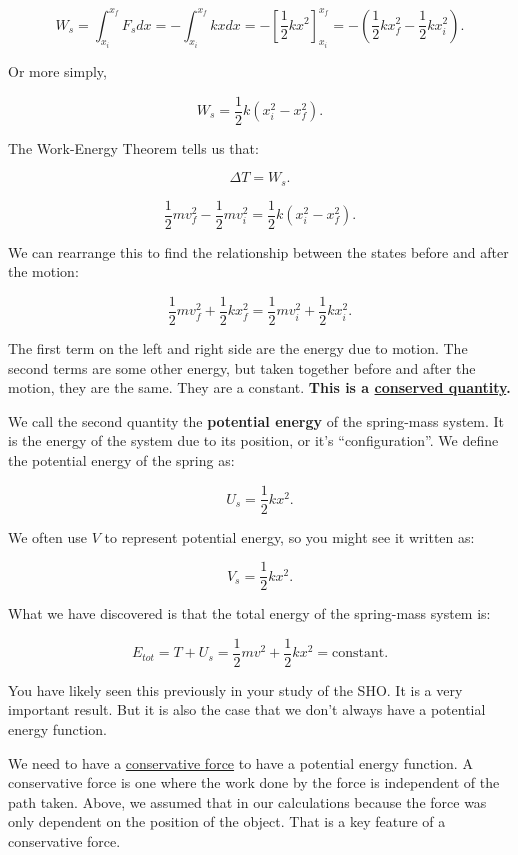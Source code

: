 \documentclass[11pt]{article}
\begin{document}
\[W_s = \int_{x_i}^{x_f} F_s dx = -\int_{x_i}^{x_f} kx dx = -\left[\dfrac{1}{2}kx^2\right]_{x_i}^{x_f} = -\left(\dfrac{1}{2}kx_f^2 - \dfrac{1}{2}kx_i^2\right).\]

Or more simply,

\[W_s = \dfrac{1}{2}k(x_i^2 - x_f^2).\]

The Work-Energy Theorem tells us that:

\[\Delta T = W_s.\]

\[\dfrac{1}{2}mv_f^2 - \dfrac{1}{2}mv_i^2 = \dfrac{1}{2}k(x_i^2 - x_f^2).\]

We can rearrange this to find the relationship between the states before
and after the motion:

\[\dfrac{1}{2}mv_f^2 + \dfrac{1}{2}k x_f^2 = \dfrac{1}{2}mv_i^2 + \dfrac{1}{2}k x_i^2.\]

The first term on the left and right side are the energy due to motion.
The second terms are some other energy, but taken together before and
after the motion, they are the same. They are a constant. \textbf{This
is a
\href{https://en.wikipedia.org/wiki/Mass\%E2\%80\%93energy_equivalence\#Conservation_of_mass_and_energy}{conserved
quantity}.}

We call the second quantity the \textbf{potential energy} of the
spring-mass system. It is the energy of the system due to its position,
or it's ``configuration''. We define the potential energy of the spring
as:

\[U_s = \dfrac{1}{2}kx^2.\]

We often use \(V\) to represent potential energy, so you might see it
written as:

\[V_s = \dfrac{1}{2}kx^2.\]

What we have discovered is that the total energy of the spring-mass
system is:

\[E_{tot} = T + U_s = \dfrac{1}{2}mv^2 + \dfrac{1}{2}kx^2 = \text{constant}.\]

You have likely seen this previously in your study of the SHO. It is a
very important result. But it is also the case that we don't always have
a potential energy function.

We need to have a
\href{https://en.wikipedia.org/wiki/Conservative_force}{conservative
force} to have a potential energy function. A conservative force is one
where the work done by the force is independent of the path taken.
Above, we assumed that in our calculations because the force was only
dependent on the position of the object. That is a key feature of a
conservative force.
\end{document}
